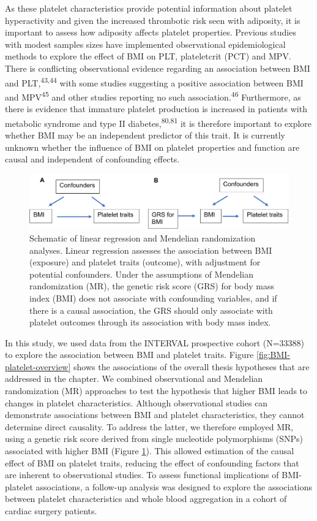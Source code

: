 \documentclass[11pt,twoside]{bristolthesis}
\begin{document}
As these platelet characteristics provide potential information about platelet hyperactivity and given the increased thrombotic risk seen with adiposity, it is important to assess how adiposity affects platelet properties. Previous studies with modest samples sizes have implemented observational epidemiological methods to explore the effect of BMI on PLT, plateletcrit (PCT) and MPV. There is conflicting observational evidence regarding an association between BMI and PLT,\textsuperscript{43,44} with some studies suggesting a positive association between BMI and MPV\textsuperscript{45} and other studies reporting no such association.\textsuperscript{46} Furthermore, as there is evidence that immature platelet production is increased in patients with metabolic syndrome and type II diabetes,\textsuperscript{80,81} it is therefore important to explore whether BMI may be an independent predictor of this trait. It is currently unknown whether the influence of BMI on platelet properties and function are causal and independent of confounding effects.
\begin{figure}
\includegraphics{figure/BMI_platelets/obsvMRexample} \caption[Schematic of linear regression and Mendelian randomization analyses]{Schematic of linear regression and Mendelian randomization analyses. Linear regression assesses the association between BMI (exposure) and platelet traits (outcome), with adjustment for potential confounders. Under the assumptions of Mendelian randomization (MR), the genetic risk score (GRS) for body mass index (BMI) does not associate with confounding variables, and if there is a causal association, the GRS should only associate with platelet outcomes through its association with body mass index.}\label{fig:Linear-reg-MR}
\end{figure}
In this study, we used data from the INTERVAL prospective cohort (N=33388) to explore the association between BMI and platelet traits. Figure \ref{fig:BMI-platelet-overview} shows the associations of the overall thesis hypotheses that are addressed in the chapter. We combined observational and Mendelian randomization (MR) approaches to test the hypothesis that higher BMI leads to changes in platelet characteristics. Although observational studies can demonstrate associations between BMI and platelet characteristics, they cannot determine direct causality. To address the latter, we therefore employed MR, using a genetic risk score derived from single nucleotide polymorphisms (SNPs) associated with higher BMI (Figure \ref{fig:Linear-reg-MR}). This allowed estimation of the causal effect of BMI on platelet traits, reducing the effect of confounding factors that are inherent to observational studies. To assess functional implications of BMI-platelet associations, a follow-up analysis was designed to explore the associations between platelet characteristics and whole blood aggregation in a cohort of cardiac surgery patients.
\end{document}
